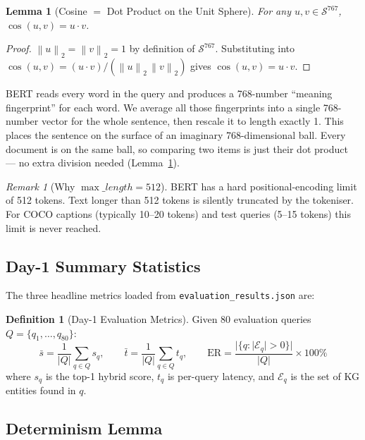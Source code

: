\documentclass[12pt,a4paper]{article}
\theoremstyle{definition}
\newtheorem{definition}{Definition}[section]
\theoremstyle{plain}
\newtheorem{lemma}[theorem]{Lemma}
\theoremstyle{remark}
\newtheorem{remark}{Remark}[section]
\newcommand{\Norm}[1]{\left\|#1\right\|_2}
\begin{document}
\begin{lemma}[Cosine $=$ Dot Product on the Unit Sphere]
\label{lem:cosdot}
For any $u, v \in \mathcal{S}^{767}$,
$\cos(u,v) = u \cdot v$.
\end{lemma}
\begin{proof}
  $\Norm{u} = \Norm{v} = 1$ by definition of $\mathcal{S}^{767}$.
  Substituting into $\cos(u,v) = (u \cdot v)/(\Norm{u}\,\Norm{v})$
  gives $\cos(u,v) = u \cdot v$.
\end{proof}

\begin{tcolorbox}[laymanbox]
BERT reads every word in the query and produces a 768-number
``meaning fingerprint'' for each word. We average all those fingerprints
into a single 768-number vector for the whole sentence, then rescale it
to length exactly 1. This places the sentence on the surface of an
imaginary 768-dimensional ball. Every document is on the same ball, so
comparing two items is just their dot product --- no extra division
needed (Lemma~\ref{lem:cosdot}).
\end{tcolorbox}

\begin{remark}[Why $\max\_length = 512$]
BERT has a hard positional-encoding limit of 512 tokens.  Text longer
than 512 tokens is silently truncated by the tokeniser.  For COCO
captions (typically 10--20 tokens) and test queries (5--15 tokens)
this limit is never reached.
\end{remark}

\subsection{Day-1 Summary Statistics}

The three headline metrics loaded from \texttt{evaluation\_results.json}
are:

\begin{definition}[Day-1 Evaluation Metrics]
\label{def:day1metrics}
Given 80 evaluation queries $Q = \{q_1,\ldots,q_{80}\}$:
\[
  \bar{s} = \frac{1}{|Q|}\sum_{q \in Q} s_q, \qquad
  \bar{t} = \frac{1}{|Q|}\sum_{q \in Q} t_q, \qquad
  \text{ER} = \frac{|\{q : |\mathcal{E}_q| > 0\}|}{|Q|} \times 100\%
\]
where $s_q$ is the top-1 hybrid score, $t_q$ is per-query latency, and
$\mathcal{E}_q$ is the set of KG entities found in $q$.
\end{definition}

\subsection{Determinism Lemma}
\end{document}
